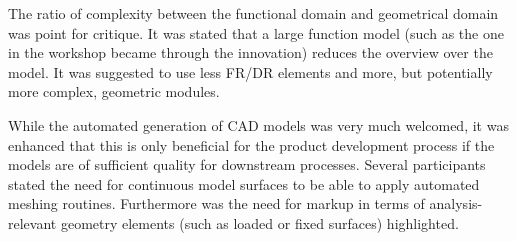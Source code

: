 \documentclass[preprints,article,accept,moreauthors,pdftex]{Definitions/mdpi}
\begin{document}
The ratio of complexity between the functional domain and geometrical domain was point for critique.
It was stated that a large function model (such as the one in the workshop became through the innovation) reduces the overview over the model.
It was suggested to use less FR/DR elements and more, but potentially more complex, geometric modules.

While the automated generation of CAD models was very much welcomed, it was enhanced that this is only beneficial for the product development process if the models are of sufficient quality for downstream processes.
Several participants stated the need for continuous model surfaces to be able to apply automated meshing routines.
Furthermore was the need for markup in terms of analysis-relevant geometry elements (such as loaded or fixed surfaces) highlighted.





\end{document}
